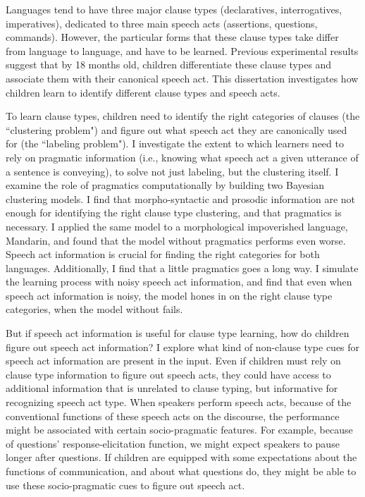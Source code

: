 
Languages tend to have three major clause types (declaratives, interrogatives, imperatives), dedicated to three main speech acts (assertions, questions, commands). However, the particular forms that these clause types take differ from language to language, and have to be learned. Previous experimental results suggest that by 18 months old, children differentiate these clause types and associate them with their canonical speech act. This dissertation investigates how children learn to identify different clause types and speech acts. 

To learn clause types, children need to identify the right categories of clauses (the ``clustering problem") and figure out what speech act they are canonically used for (the ``labeling problem"). I investigate the extent to which learners need to rely on pragmatic information (i.e., knowing what speech act a given utterance of a sentence is conveying), to solve not just labeling, but the clustering itself. I examine the role of pragmatics computationally by building two Bayesian clustering models. I find that morpho-syntactic and prosodic information are not enough for identifying the right clause type clustering, and that pragmatics is necessary. I applied the same model to a morphological impoverished language, Mandarin, and found that the model without pragmatics performs even worse. Speech act information is crucial for finding the right categories for both languages. Additionally, I find that a little pragmatics goes a long way. I simulate the learning process with noisy speech act information, and find that even when speech act information is noisy, the model hones in on the right clause type categories, when the model without fails. 


But if speech act information is useful for clause type learning, how do children figure out speech act information? I explore what kind of non-clause type cues for speech act information are present in the input. Even if children must rely on clause type information to figure out speech acts, they could have access to additional information that is unrelated to clause typing, but informative for recognizing speech act type. When speakers perform speech acts, because of the conventional functions of these speech acts on the discourse, the performance might be associated with certain socio-pragmatic features. For example, because of questions' response-elicitation function, we might expect speakers to pause longer after questions. If children are equipped with some expectations about the functions of communication, and about what questions do, they might be able to use these socio-pragmatic cues to figure out speech act. 

